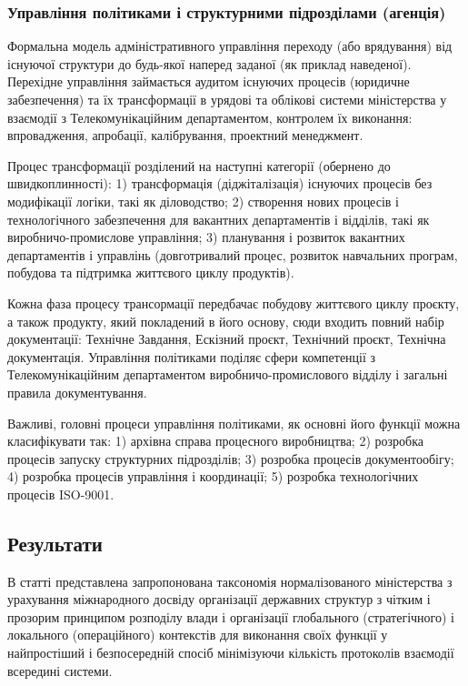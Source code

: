 \subsubsection{Управління політиками і структурними підрозділами (агенція)}

Формальна модель адміністративного управління переходу (або врядування) від існуючої структури до будь-якої наперед заданої (як приклад наведеної). Перехідне управління займається аудитом існуючих процесів (юридичне забезпечення) та їх трансформації в урядові та облікові системи міністерства у взаємодії з Телекомунікаційним департаментом, контролем їх виконання: впровадження, апробації, калібрування, проектний менеджмент.

Процес трансформації розділений на наступні категорії (обернено до швидкоплинності): 1) трансформація (діджіталізація) існуючих процесів без модифікації логіки, такі як діловодство; 2) створення нових процесів і технологічного забезпечення для вакантних департаментів і відділів, такі як виробничо-промислове управління; 3) планування і розвиток вакантних департаментів і управлінь (довготривалий процес, розвиток навчальних програм, побудова та підтримка життєвого циклу продуктів).

Кожна фаза процесу трансормації передбачає побудову життєвого циклу проєкту, а також продукту, який покладений в його основу, сюди входить повний набір документації: Технічне Завдання, Ескізний проєкт, Технічний проєкт, Технічна документація. Управління політиками поділяє сфери компетенції з Телекомунікаційним департаментом виробничо-промислового відділу і загальні правила документування.

Важливі, головні процеси управління політиками, як основні його функції можна класифікувати так: 1) архівна справа процесного виробництва; 2) розробка процесів запуску структурних підрозділів; 3) розробка процесів документообігу; 4) розробка процесів управління і координації; 5) розробка технологічних процесів ISO-9001.

\subsection{Результати}

В статті представлена запропонована таксономія нормалізованого міністерства з урахування міжнародного досвіду організації державних структур з чітким і прозорим принципом розподілу влади і організації глобального (стратегічного) і локального (операційного) контекстів для виконання своїх функції у найпростіший і безпосередній спосіб мінімізуючи кількість протоколів взаємодії всередині системи.

